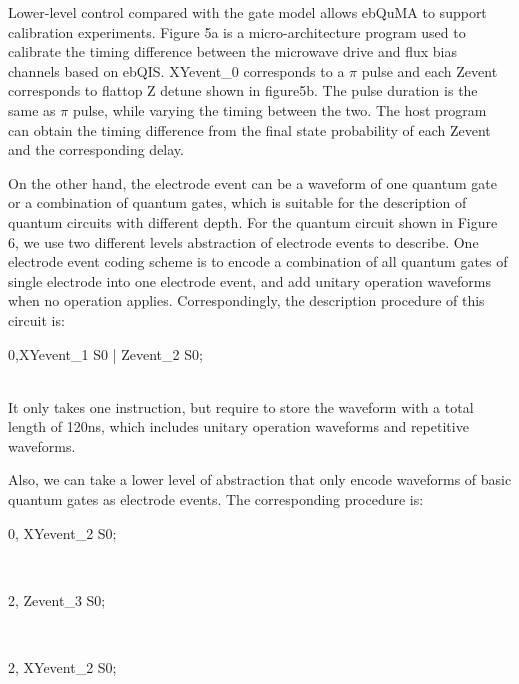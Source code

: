 Lower-level control compared with the gate model allows ebQuMA to support calibration experiments.
Figure 5a is a micro-architecture program used to calibrate the timing diﬀerence between the microwave drive and ﬂux bias channels based on ebQIS. 
XYevent\_0 corresponds to a $\pi$ pulse and each Zevent corresponds to ﬂattop Z detune shown in figure5b. 
The pulse duration is the same as $\pi$ pulse, while varying the timing between the two. 
The host program can obtain the timing difference from the final state probability of each Zevent and the corresponding delay.

On the other hand, the electrode event can be a waveform of one quantum gate or a combination of quantum gates, which is suitable for the description of quantum circuits with different depth. 
For the quantum circuit shown in Figure 6, we use two different levels abstraction of electrode events to describe. 
One electrode event coding scheme is to encode a combination of all quantum gates of single electrode into one electrode event, and add unitary operation waveforms when no operation applies. 
Correspondingly, the description procedure of this circuit is:\\
\centerline{0,\quad  XYevent\_1 \quad S0 \quad | \quad Zevent\_2 \quad S0;}\\
It only takes one instruction, but require to store the waveform with a total length of 120ns, which includes unitary operation waveforms and repetitive waveforms.

Also, we can take a lower level of abstraction that only encode waveforms of basic quantum gates as electrode events. 
The corresponding procedure is:\\
\centerline{0, \quad XYevent\_2 \quad S0;}\\
\centerline{2, \qquad  Zevent\_3 \quad S0;}\\
\centerline{2, \quad  XYevent\_2 \quad S0;}\\


